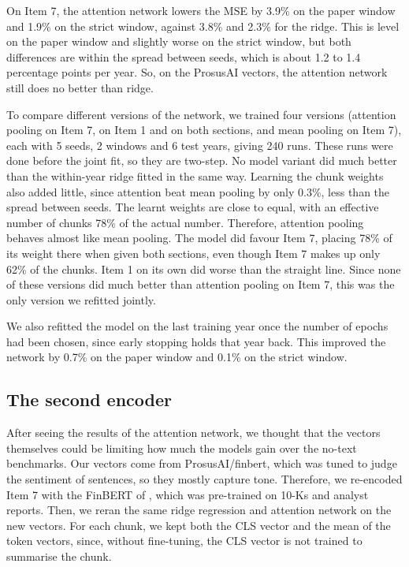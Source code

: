 \documentclass[11pt,a4paper]{article}
\begin{document}
On Item 7, the attention network lowers the MSE by 3.9\% on the paper window and 1.9\% on the strict window, against 3.8\% and 2.3\% for the ridge. This is level on the paper window and slightly worse on the strict window, but both differences are within the spread between seeds, which is about 1.2 to 1.4 percentage points per year. So, on the ProsusAI vectors, the attention network still does no better than ridge.

To compare different versions of the network, we trained four versions (attention pooling on Item 7, on Item 1 and on both sections, and mean pooling on Item 7), each with 5 seeds, 2 windows and 6 test years, giving 240 runs. These runs were done before the joint fit, so they are two-step. No model variant did much better than the within-year ridge fitted in the same way. Learning the chunk weights also added little, since attention beat mean pooling by only 0.3\%, less than the spread between seeds. The learnt weights are close to equal, with an effective number of chunks 78\% of the actual number. Therefore, attention pooling behaves almost like mean pooling. The model did favour Item 7, placing 78\% of its weight there when given both sections, even though Item 7 makes up only 62\% of the chunks. Item 1 on its own did worse than the straight line. Since none of these versions did much better than attention pooling on Item 7, this was the only version we refitted jointly.

We also refitted the model on the last training year once the number of epochs had been chosen, since early stopping holds that year back. This improved the network by 0.7\% on the paper window and 0.1\% on the strict window.

\subsection{The second encoder}\label{sec:methods-encoder}

After seeing the results of the attention network, we thought that the vectors themselves could be limiting how much the models gain over the no-text benchmarks. Our vectors come from ProsusAI/finbert, which was tuned to judge the sentiment of sentences, so they mostly capture tone. Therefore, we re-encoded Item 7 with the FinBERT of \citet{yang2020}, which was pre-trained on 10-Ks and analyst reports. Then, we reran the same ridge regression and attention network on the new vectors. For each chunk, we kept both the CLS vector and the mean of the token vectors, since, without fine-tuning, the CLS vector is not trained to summarise the chunk.
\end{document}
